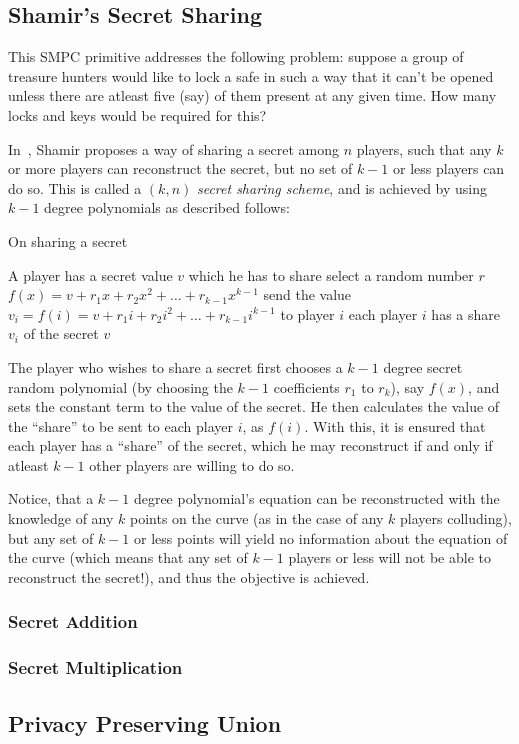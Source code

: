 \subsection{Shamir's Secret Sharing}
\label{sec:sss-prim}
This SMPC primitive addresses the following problem: suppose a group of
treasure hunters would like to lock a safe in such a way that it can't 
be opened unless there are atleast five (say) of them present at any given time. 
How many locks and keys would be required for this?

In~\cite{S79:HtSaS}, Shamir proposes a way of sharing a secret among $n$ 
players, such that any $k$ or more players can reconstruct the secret,
but no set of $k-1$ or less players can do so. This is called a $(k,n)$ 
{\it secret sharing scheme}, and is achieved by using $k-1$ degree polynomials
as described follows: 

\begin{algorithm}
\caption{On sharing a secret}
\label{algshare}
\begin{algorithmic}
\REQUIRE A player has a secret value $v$ which he has to share
\STATE select a random number $r$
\STATE $f(x) = v + r_{1}x + r_{2}x^{2} + \ldots + r_{k-1}x^{k-1}$
	\STATE send the value $v_{i}= f(i) = v + r_{1}i + r_{2}i^{2} + \ldots + r_{k-1}i^{k-1}$ to player $i$
\ENDFOR
\ENSURE each player $i$ has a share $v_{i}$ of the secret $v$
\end{algorithmic}
\end{algorithm}

The player who wishes to share a secret first chooses a $k-1$ degree
secret random polynomial (by choosing the $k-1$ coefficients $r_1$ to $r_k$),
say $f(x)$,
and sets the constant term to the value of the secret. He then calculates
the value of the ``share'' to be sent to each player $i$, as $f(i)$. With
this, it is ensured that each player has a ``share'' of the secret, which
he may reconstruct if and only if atleast $k-1$ other players are willing
to do so.

Notice, that
a $k-1$ degree polynomial's equation can be reconstructed with the knowledge
of any $k$ points on the curve (as in the case of any $k$ players colluding),
but any set of $k-1$ or less points will yield no information
about the equation of the curve (which means that any set of $k-1$ players
or less will not be able to reconstruct the secret!), and thus the objective
is achieved.

\subsubsection{Secret Addition}
\label{sec:add-prim}

\subsubsection{Secret Multiplication}
\label{sec:mult-prim}

\subsection{Privacy Preserving Union}
\label{sec:union-prim}
